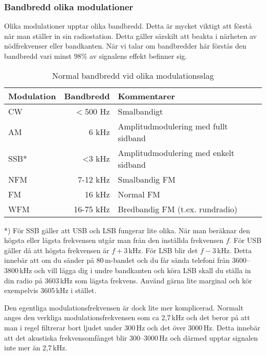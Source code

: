 \subsubsection{Bandbredd olika modulationer}

Olika modulationer upptar olika bandbredd. Detta är mycket viktigt att förstå
när man ställer in sin radiostation. Detta gäller särskilt att beakta i närheten
av nödfrekvenser eller bandkanten. När vi talar om bandbredder här förstås den
bandbredd vari minst 98\% av signalens effekt befinner sig.

\begin{table}[H]
\centering
\begin{tabular}{lrl}
	\textbf{Modulation} & \textbf{Bandbredd} & \textbf{Kommentarer}                  \\ \hline
	CW                  &          $<$500 Hz & Smalbandigt                           \\
	AM                  &              6 kHz & Amplitudmodulering med fullt sidband  \\
	SSB*                &              <3 kHz & Amplitudmodulering med enkelt sidband \\
	NFM                 &           7-12 kHz & Smalbandig FM                         \\
	FM                  &             16 kHz & Normal FM                             \\
	WFM                 &          16-75 kHz & Bredbandig FM (t.ex. rundradio)
\end{tabular}
\caption{Normal bandbredd vid olika modulationsslag}
\end{table}

*) För SSB gäller att USB och LSB fungerar lite olika. När man beräknar den
högsta eller lägsta frekvensen utgår man från den inställda frekvensen $f$. För
USB gäller då att högsta frekvensen är $f+3$\,kHz. För LSB blir det
$f-3$\,kHz. Detta innebär att om du sänder på 80\,m-bandet och du får sända
telefoni från 3600--3800\,kHz och vill lägga dig i undre bandkanten och köra LSB
skall du ställa in din radio på 3603\,kHz som lägsta frekvens. Använd gärna lite
marginal och kör exempelvis 3605\,kHz i stället.

Den egentliga modulationsfrekvensen är dock lite mer komplicerad. Normalt anges
den verkliga modulationsfrekvensen som ca 2,7\,kHz och det beror på att man i
regel filtrerar bort ljudet under 300\,Hz och det över 3000\,Hz. Detta innebär
att det akustiska frekvensomfånget blir 300--3000\,Hz och därmed upptar signalen
inte mer än 2,7\,kHz.

